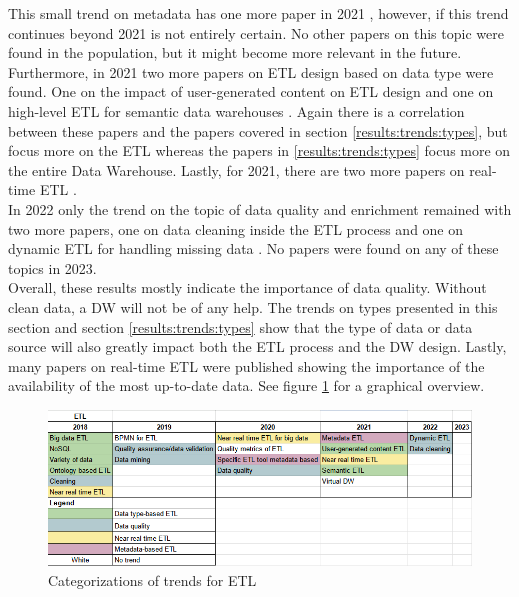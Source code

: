 \documentclass[11pt]{article}
\begin{document}
This small trend on metadata has one more paper in 2021 \cite{Panfilov2021139}, however, if this trend continues beyond 2021 is not entirely certain. No other papers on this topic were found in the population, but it might become more relevant in the future. Furthermore, in 2021 two more papers on ETL design based on data type were found. One on the impact of user-generated content on ETL design \cite{Walha2021374} and one on high-level ETL for semantic data warehouses \cite{DebNath202185}. Again there is a correlation between these papers and the papers covered in section \ref{results:trends:types}, but \cite{Walha2021374, DebNath202185} focus more on the ETL whereas the papers in \ref{results:trends:types} focus more on the entire Data Warehouse. Lastly, for 2021, there are two more papers on real-time ETL \cite{DeAssisVilela2021556, Ghosh2021585}. \\

In 2022 only the trend on the topic of data quality and enrichment remained with two more papers, one on data cleaning inside the ETL process \cite{Wrembel20223} and one on dynamic ETL for handling missing data \cite{BadiuzzamanBiplob2022243}. No papers were found on any of these topics in 2023. \\

Overall, these results mostly indicate the importance of data quality. Without clean data, a DW will not be of any help. The trends on types presented in this section and section \ref{results:trends:types} show that the type of data or data source will also greatly impact both the ETL process and the DW design. Lastly, many papers on real-time ETL were published showing the importance of the availability of the most up-to-date data. See figure \ref{fig:etl} for a graphical overview. \\

\begin{figure}
\centering
\includegraphics[scale=0.75]{Images/ETL.png}
\caption{Categorizations of trends for ETL}
\label{fig:etl}
\end{figure}
\end{document}

